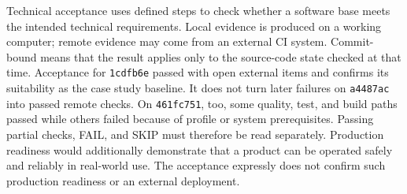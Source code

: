 \begin{beginnerstatement}

Technical acceptance uses defined steps to check whether a software base meets
the intended technical requirements. Local evidence is produced on a working
computer; remote evidence may come from an external CI system. Commit-bound
means that the result applies only to the source-code state checked at that
time. Acceptance for \texttt{1cdfb6e} passed with open external items and
confirms its suitability as the case study baseline. It does not turn later
failures on \texttt{a4487ac} into passed remote checks. On \texttt{461fc751},
too, some quality, test, and build paths passed while others failed because of
profile or system prerequisites. Passing partial checks, FAIL, and SKIP must
therefore be read separately. Production readiness
would additionally demonstrate that a product can be operated safely and
reliably in real-world use. The acceptance expressly does not confirm such
production readiness or an external deployment.

\end{beginnerstatement}
